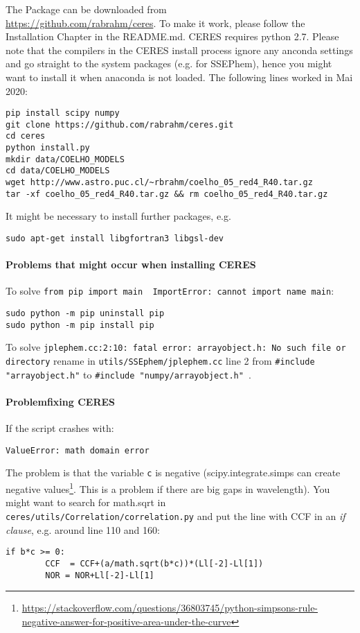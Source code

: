 \documentclass[10pt,a4paper]{article}
\begin{document}
The Package can be downloaded from\\ \url{https://github.com/rabrahm/ceres}. To make it work, please follow the Installation Chapter in the README.md. CERES requires python 2.7. Please note that the compilers in the CERES install process ignore any anconda settings and go straight to the system packages (e.g. for SSEPhem), hence you might want to install it when anaconda is not loaded. The following lines worked in Mai 2020:
\begin{lstlisting}[style=base]
pip install scipy numpy
git clone https://github.com/rabrahm/ceres.git
cd ceres
python install.py
mkdir data/COELHO_MODELS
cd data/COELHO_MODELS
wget http://www.astro.puc.cl/~rbrahm/coelho_05_red4_R40.tar.gz
tar -xf coelho_05_red4_R40.tar.gz && rm coelho_05_red4_R40.tar.gz
\end{lstlisting}

It might be necessary to install further packages, e.g.
\begin{lstlisting}[style=base]
sudo apt-get install libgfortran3 libgsl-dev
\end{lstlisting}


\paragraph{Problems that might occur when installing CERES\\}

To solve \verb|from pip import main  ImportError: cannot import name main|:
\begin{lstlisting}[style=base]
sudo python -m pip uninstall pip
sudo python -m pip install pip
\end{lstlisting}

To solve \verb|jplephem.cc:2:10: fatal error: arrayobject.h: No such file or directory| rename in \verb|utils/SSEphem/jplephem.cc| line 2 from \verb|#include "arrayobject.h"| to \verb|#include "numpy/arrayobject.h"|~.

\paragraph{Problemfixing CERES\\}

If the script crashes with:
\begin{lstlisting}[style=base]
ValueError: math domain error
\end{lstlisting}
The problem is that the variable \verb|c| is negative (scipy.integrate.simps can create negative values\footnote{\url{https://stackoverflow.com/questions/36803745/python-simpsons-rule-negative-answer-for-positive-area-under-the-curve}}. This is a problem if there are big gaps in wavelength). You might want to search for math.sqrt in \verb|ceres/utils/Correlation/correlation.py| and put the line with CCF in an \textit{if clause}, e.g. around line 110 and 160:
\begin{lstlisting}[style=base]
	if b*c >= 0:
	    CCF  = CCF+(a/math.sqrt(b*c))*(Ll[-2]-Ll[1])
	    NOR = NOR+Ll[-2]-Ll[1]
\end{lstlisting}
\end{document}
